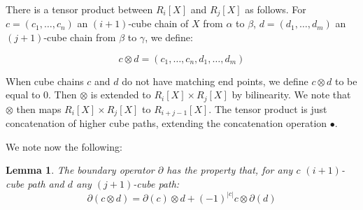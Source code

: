\documentclass{article}
\newtheorem{lemma}[definition]{Lemma} %
\begin{document}
\label{sec:precuboperations}

There is a tensor product between $R_i[X]$ and $R_j[X]$ as follows. For $c=(c_1,\ldots,c_n)$ an $(i+1)$-cube chain of $X$ from $\alpha$ to $\beta$, $d=(d_1,\ldots,d_m)$ an $(j+1)$-cube chain from $\beta$ to $\gamma$, we define: 

$$
c\otimes d=(c_1,\ldots,c_n,d_1,\ldots,d_m)
$$

When cube chains $c$ and $d$ do not have matching end points, we define $c\otimes d$ to be equal to 0. Then $\otimes$ is extended to $R_i[X]\times R_j[X]$ by bilinearity. We note that $\otimes$ then maps $R_i[X]\times R_j[X]$ to $R_{i+j-1}[X]$. The tensor product is just concatenation of higher cube paths, extending the concatenation operation $\bullet$. 

We note now the following:

\begin{lemma}
\label{lem:diffalg}
    The boundary operator $\partial$ has the property that, for any $c$ $(i+1)$-cube path and $d$ any $(j+1)$-cube path:
$$
\partial(c\otimes d) = \partial(c)\otimes d +(-1)^{|c|} c\otimes \partial(d)
$$
\end{lemma}
\end{document}
